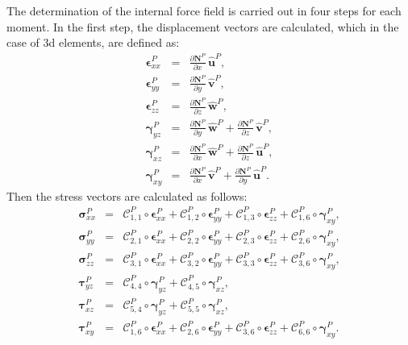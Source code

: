 The determination of the internal force field is carried out in four steps for each moment.
In the first step, the displacement vectors are calculated, which in the case of \ac{3d} elements, are defined as:
\begin{eqnarray}
	\label{eq:strain}
	\boldsymbol{\epsilon}^P_{xx} &=& \frac{\partial \textbf{N}^P}{\partial x}\, \widehat{\textbf{u}}^P,\\
	\boldsymbol{\epsilon}^P_{yy} &=& \frac{\partial \textbf{N}^P}{\partial y}\, \widehat{\textbf{v}}^P,\\
	\boldsymbol{\epsilon}^P_{zz} &=& \frac{\partial \textbf{N}^P}{\partial z}\, \widehat{\textbf{w}}^P,\\
	\boldsymbol{\gamma}^P_{yz} &=& \frac{\partial \textbf{N}^P}{\partial y}\, \widehat{\textbf{w}}^P + \frac{\partial \textbf{N}^P}{\partial z}\, \widehat{\textbf{v}}^P,\\
	\boldsymbol{\gamma}^P_{xz} &=&  \frac{\partial \textbf{N}^P}{\partial x}\, \widehat{\textbf{w}}^P + \frac{\partial \textbf{N}^P}{\partial z}\, \widehat{\textbf{u}}^P,\\
	\boldsymbol{\gamma}^P_{xy} &=&  \frac{\partial \textbf{N}^P}{\partial x}\, \widehat{\textbf{v}}^P + \frac{\partial \textbf{N}^P}{\partial y}\, \widehat{\textbf{u}}^P.
\end{eqnarray}
Then the stress vectors are calculated as follows: 
\begin{eqnarray}
	\label{eq:stress}
	\boldsymbol{\sigma}^P_{xx} &=& \mathcal{C}^P_{1,1}\circ\boldsymbol{\epsilon}^P_{xx} +  \mathcal{C}^P_{1,2}\circ\boldsymbol{\epsilon}^P_{yy} + \mathcal{C}^P_{1,3}\circ\boldsymbol{\epsilon}^P_{zz} +
	\mathcal{C}^P_{1,6}\circ\boldsymbol{\gamma}^P_{xy},\\
	\boldsymbol{\sigma}^P_{yy} &=& \mathcal{C}^P_{2,1}\circ\boldsymbol{\epsilon}^P_{xx} +  \mathcal{C}^P_{2,2}\circ\boldsymbol{\epsilon}^P_{yy} + \mathcal{C}^P_{2,3}\circ\boldsymbol{\epsilon}^P_{zz} +
	\mathcal{C}^P_{2,6}\circ\boldsymbol{\gamma}^P_{xy},\\
	\boldsymbol{\sigma}^P_{zz} &=& \mathcal{C}^P_{3,1}\circ\boldsymbol{\epsilon}^P_{xx} +  \mathcal{C}^P_{3,2}\circ\boldsymbol{\epsilon}^P_{yy} + \mathcal{C}^P_{3,3}\circ\boldsymbol{\epsilon}^P_{zz} +
	\mathcal{C}^P_{3,6}\circ\boldsymbol{\gamma}^P_{xy},\\
	\boldsymbol{\tau}^P_{yz} &=& \mathcal{C}^P_{4,4}\circ\boldsymbol{\gamma}^P_{yz} +  \mathcal{C}^P_{4,5}\circ\boldsymbol{\gamma}^P_{xz},\\
	\boldsymbol{\tau}^P_{xz} &=& \mathcal{C}^P_{5,4}\circ\boldsymbol{\gamma}^P_{yz} +  \mathcal{C}^P_{5,5}\circ\boldsymbol{\gamma}^P_{xz},\\
	\boldsymbol{\tau}^P_{xy} &=& \mathcal{C}^P_{1,6}\circ\boldsymbol{\epsilon}^P_{xx} +  \mathcal{C}^P_{2,6}\circ\boldsymbol{\epsilon}^P_{yy} + \mathcal{C}^P_{3,6}\circ\boldsymbol{\epsilon}^P_{zz} +
	\mathcal{C}^P_{6,6}\circ\boldsymbol{\gamma}^P_{xy}.
\end{eqnarray}
